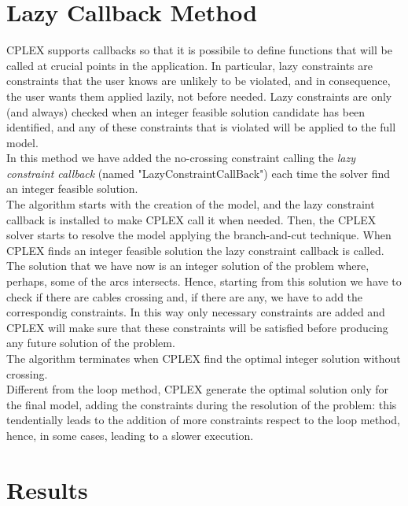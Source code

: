 \section{Lazy Callback Method}
\textsc{CPLEX} supports callbacks so that it is possibile to define functions that will be called at crucial points in the application. In particular, lazy constraints are constraints that the user knows are unlikely to be violated, and in consequence, the user
wants them applied lazily, not before needed. Lazy constraints are only (and always) checked when an integer feasible solution candidate has been identified, and any of these constraints that is violated will be applied to the full model. \\
In this method we have added the no-crossing constraint calling the \textit{lazy constraint callback} (named "LazyConstraintCallBack") each time the solver find an integer feasible solution. \\
The algorithm starts with the creation of the model, and the lazy constraint callback is installed to make \textsc{CPLEX} call it when needed. Then, the \textsc{CPLEX} solver starts to resolve the model applying the branch-and-cut technique. When \textsc{CPLEX} finds an integer feasible solution the lazy constraint callback is called. The solution that we have now is an integer solution of the problem where, perhaps, some of
the arcs intersects. Hence, starting from this solution we have to check if there are cables crossing and, if there are any, we have to add the correspondig constraints. In this way only necessary constraints are added and \textsc{CPLEX} will make sure that these constraints will be satisfied before producing any future solution of the problem.\\
The algorithm terminates when \textsc{CPLEX} find the optimal integer solution without crossing. \\
Different from the loop method, \textsc{CPLEX} generate the optimal solution only for the final model, adding the constraints during the resolution of the problem: this tendentially leads to the addition of more constraints respect to the loop method, hence, in some cases, leading to a slower execution.
\section{Results}
